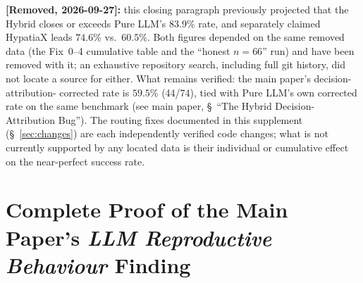 \documentclass[twoside,11pt]{article}
\begin{document}
\bigskip
\noindent \textbf{[Removed, 2026-09-27]:} this closing paragraph previously
projected that the Hybrid closes or exceeds Pure LLM's $83.9\%$ rate, and
separately claimed HypatiaX leads $74.6\%$ vs.\ $60.5\%$. Both figures
depended on the same removed data (the Fix~0--4 cumulative table and the
``honest $n{=}66$'' run) and have been removed with it; an exhaustive
repository search, including full git history, did not locate a source
for either. What remains verified: the main paper's decision-attribution-
corrected rate is $59.5\%$ (44/74), tied with Pure LLM's own corrected
rate on the same benchmark (see main paper, \S~``The Hybrid
Decision-Attribution Bug''). The routing fixes documented in this
supplement (\S~\ref{sec:changes}) are each independently verified code
changes; what is not currently supported by any located data is their
individual or cumulative effect on the near-perfect success rate.

\appendix

\section{Complete Proof of the Main Paper's \emph{LLM Reproductive Behaviour} Finding}
\label{app:proof}
\end{document}
